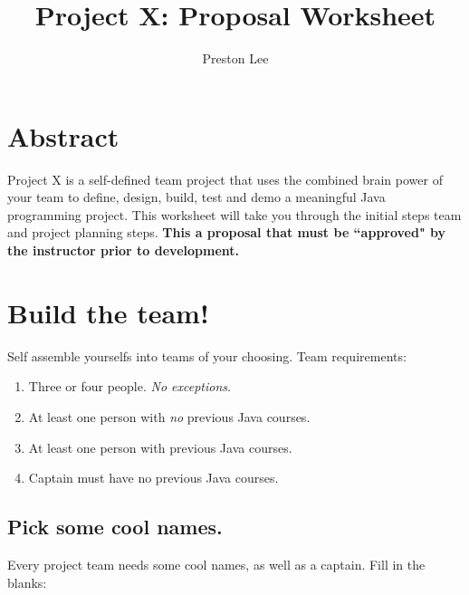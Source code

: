 \documentclass[11pt]{article}
\title{Project X: Proposal Worksheet}
\author{Preston Lee}
\date{}                                           %
\begin{document}
\maketitle
\tableofcontents

\section{Abstract}
Project X is a self-defined team project that uses the combined brain power of your team to define, design, build, test and demo a meaningful Java programming project. This worksheet will take you through the initial steps team and project planning steps. {\bf This a proposal that must be ``approved" by the instructor prior to development.}

\pagebreak
 
\section{Build the team!}
Self assemble yourselfs into teams of your choosing. Team requirements:
\begin{enumerate}
\item Three or four people. {\it No exceptions}.
\item At least one person with {\it no} previous Java courses.
\item At least one person with previous Java courses.
\item Captain must have no previous Java courses.
\end{enumerate}

\subsection{Pick some cool names.}
Every project team needs some cool names, as well as a captain. Fill in the blanks:

\hspace{.5in}{\bf Team Captain: }

\hspace{.5in}{\bf Team Code Name: }

\hspace{.5in}{\bf Project Code Name: }

\end{document}
